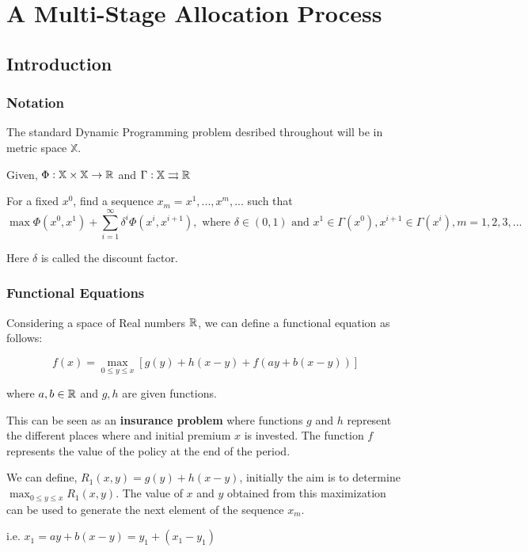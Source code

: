 
\section{A Multi-Stage Allocation Process}

\subsection{Introduction}
\subsubsection*{Notation}

The standard Dynamic Programming problem desribed throughout will be in metric space $\mathbb{X}$.

Given, $\Phi: \mathbb{X} \times \mathbb{X} \to \mathbb{R}$ and $\Gamma: \mathbb{X} \rightrightarrows \mathbb{R}$

For a fixed $x^0$, find a sequence ${x_m} = {x^1, ..., x^m, ...}$ such that
$$
\max \Phi(x^0, x^1) + \sum_{i=1}^{\infty}\delta^i \Phi(x^i, x^{i+1}), \text{ where } \delta \in (0,1) \text{ and } x^1 \in \Gamma(x^0), x^{i+1} \in \Gamma(x^i), m = 1,2,3,...
$$

Here $\delta$ is called the discount factor.

\subsubsection*{Functional Equations}

Considering a space of Real numbers $\mathbb{R}$, we can define a functional equation as follows:

$$
f(x) = \max_{0 \le y \le x} [g(y) + h(x-y) + f(ay+b(x-y))]
$$

where $a,b \in \mathbb{R}$ and $g,h$ are given functions.

This can be seen as an \textbf{insurance problem} where functions $g$ and $h$ represent the different places where and initial premium $x$ is invested. The function $f$ represents the value of the policy at the end of the period.

\vspace{5mm}
We can define, $R_1(x, y) = g(y) + h(x-y)$, initially the aim is to determine $\max_{0 \le y \le x} R_1(x, y)$. The value of $x$ and $y$ obtained from this maximization can be used to generate the next element of the sequence $x_m$.

i.e. $x_1 = ay + b(x-y) = y_1 + (x_1-y_1)$

